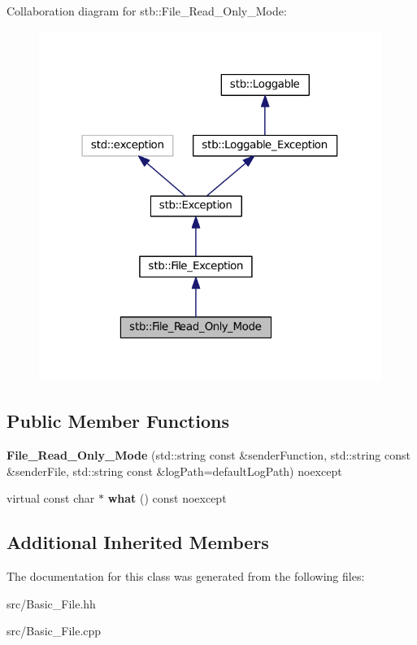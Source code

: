Collaboration diagram for stb\+:\+:File\+\_\+\+Read\+\_\+\+Only\+\_\+\+Mode\+:
\nopagebreak
\begin{figure}[H]
\begin{center}
\leavevmode
\includegraphics[width=316pt]{classstb_1_1File__Read__Only__Mode__coll__graph}
\end{center}
\end{figure}
\subsection*{Public Member Functions}
\begin{DoxyCompactItemize}
\item 
\hypertarget{classstb_1_1File__Read__Only__Mode_a6cd03935bc72fe2c337bda87620a98ae}{{\bfseries File\+\_\+\+Read\+\_\+\+Only\+\_\+\+Mode} (std\+::string const \&sender\+Function, std\+::string const \&sender\+File, std\+::string const \&log\+Path=default\+Log\+Path) noexcept}\label{classstb_1_1File__Read__Only__Mode_a6cd03935bc72fe2c337bda87620a98ae}

\item 
\hypertarget{classstb_1_1File__Read__Only__Mode_ac00764445bbec641cd9af680c6bb2ae7}{virtual const char $\ast$ {\bfseries what} () const noexcept}\label{classstb_1_1File__Read__Only__Mode_ac00764445bbec641cd9af680c6bb2ae7}

\end{DoxyCompactItemize}
\subsection*{Additional Inherited Members}


The documentation for this class was generated from the following files\+:\begin{DoxyCompactItemize}
\item 
src/Basic\+\_\+\+File.\+hh\item 
src/Basic\+\_\+\+File.\+cpp\end{DoxyCompactItemize}
